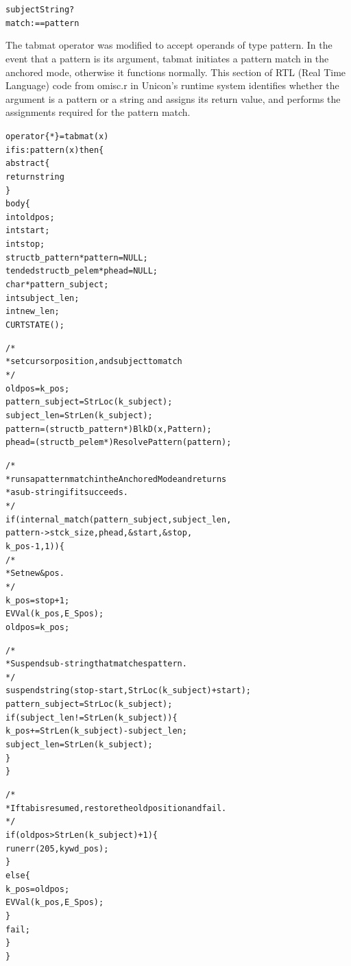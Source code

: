 \documentclass{article}
\begin{document}
\begin{alltt}
   subjectString ? {
      match := =pattern
   }
\end{alltt}

The tabmat operator was modified to accept operands of type pattern.  In the event that a pattern is its argument, tabmat initiates a pattern match in the anchored mode, otherwise it functions normally.  This section of RTL (Real Time Language) code from omisc.r in Unicon's runtime system identifies whether the argument is a pattern or a string and assigns its return value, and performs the assignments required for the pattern match.

\begin{alltt}
operator\{*\} = tabmat(x)
   if is:pattern(x) then \{
      abstract \{
         return string
         \}
      body \{
         int oldpos;
         int start;
         int stop;
         struct b_pattern *pattern = NULL;
         tended struct b_pelem *phead = NULL; 
         char * pattern_subject;
         int subject_len;
         int new_len;
         CURTSTATE();
         
         /*
          * set cursor position, and subject to match
          */
         oldpos = k_pos;
         pattern_subject = StrLoc(k_subject);
         subject_len = StrLen(k_subject);
         pattern = (struct b_pattern *)BlkD(x, Pattern);
         phead = (struct b_pelem *)ResolvePattern(pattern);
         
         /*
          * runs a pattern match in the Anchored Mode and returns
          * a sub-string if it succeeds.
          */
         if (internal_match(pattern_subject, subject_len, 
               pattern->stck_size, phead, &start, &stop, 
               k_pos - 1, 1))\{
            /*
             * Set new &pos.
             */ 
            k_pos = stop + 1;
            EVVal(k_pos, E_Spos);	
            oldpos = k_pos;
         
            /*
             * Suspend sub-string that matches pattern.
             */
            suspend string(stop - start, StrLoc(k_subject)+ start);
            pattern_subject = StrLoc(k_subject);
            if (subject_len != StrLen(k_subject)) \{
               k_pos += StrLen(k_subject) - subject_len;
               subject_len = StrLen(k_subject);
               \}
            \}
            
         /*
          * If tab is resumed, restore the old position and fail.
          */
         if (oldpos > StrLen(k_subject) + 1)\{
            runerr(205, kywd_pos);
            \} 
         else \{
            k_pos = oldpos;
            EVVal(k_pos, E_Spos);
            \}
         fail;
         \}
      \}
\end{alltt}
\end{document}
